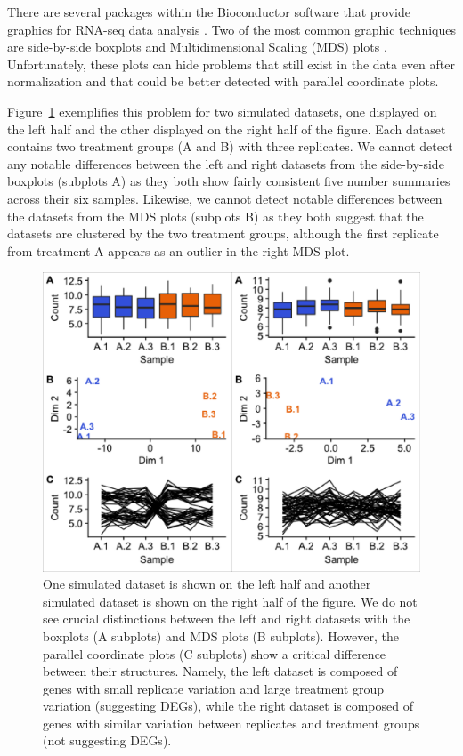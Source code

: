 \documentclass{bioinfo}
\begin{document}
There are several packages within the Bioconductor software that provide graphics for RNA-seq data analysis \citep{Huber}. Two of the most common graphic techniques are side-by-side boxplots and Multidimensional Scaling (MDS) plots \citep{Love, Risso, Robinson, Ritchie}. Unfortunately, these plots can hide problems that still exist in the data even after normalization and that could be better detected with parallel coordinate plots.

Figure~\ref{simulatedData} exemplifies this problem for two simulated datasets, one displayed on the left half and the other displayed on the right half of the figure. Each dataset contains two treatment groups (A and B) with three replicates. We cannot detect any notable differences between the left and right datasets from the side-by-side boxplots (subplots A) as they both show fairly consistent five number summaries across their six samples. Likewise, we cannot detect notable differences between the datasets from the MDS plots (subplots B) as they both suggest that the datasets are clustered by the two treatment groups, although the first replicate from treatment A appears as an outlier in the right MDS plot.

\begin{figure}
\includegraphics[width=\linewidth]{simulatedData.eps}
\caption{One simulated dataset is shown on the left half and another simulated dataset is shown on the right half of the figure. We do not see crucial distinctions between the left and right datasets with the boxplots (A subplots) and MDS plots (B subplots). However, the parallel coordinate plots (C subplots) show a critical difference between their structures. Namely, the left dataset is composed of genes with small replicate variation and large treatment group variation (suggesting DEGs), while the right dataset is composed of genes with similar variation between replicates and treatment groups (not suggesting DEGs). 
\label{simulatedData}}
\end{figure}
\end{document}
